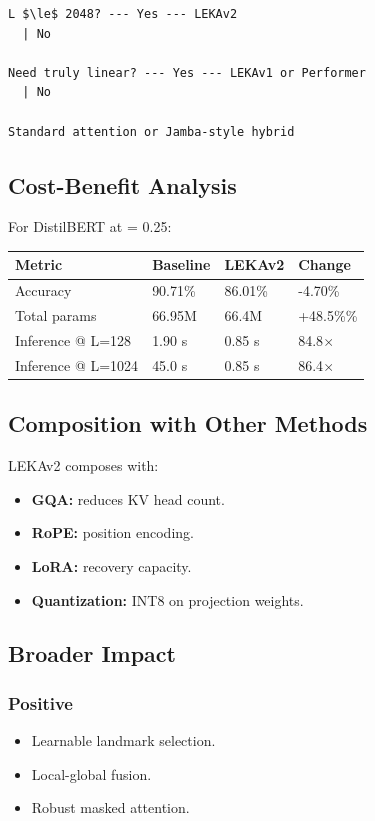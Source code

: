 \begin{lstlisting}
L $\le$ 2048? --- Yes --- LEKAv2
  | No
   
Need truly linear? --- Yes --- LEKAv1 or Performer
  | No
   
Standard attention or Jamba-style hybrid
\end{lstlisting}

\subsection{Cost-Benefit Analysis}

For DistilBERT at   = 0.25:

\begin{table}[H]
\centering
\small
\begin{tabular}{llll}
\toprule
\textbf{Metric} & \textbf{Baseline} & \textbf{LEKAv2} & \textbf{Change} \\
\midrule
Accuracy & 90.71\% & 86.01\% & -4.70\% \\
Total params & 66.95M & 66.4M & +48.5\%\% \\
Inference @ L=128 & 1.90 s & 0.85 s & 84.8$\times$ \\
Inference @ L=1024 & 45.0 s & 0.85 s & 86.4$\times$ \\
\bottomrule
\end{tabular}
\end{table}

\subsection{Composition with Other Methods}

LEKAv2 composes with:

\begin{itemize}
\item \textbf{GQA:} reduces KV head count.
\item \textbf{RoPE:} position encoding.
\item \textbf{LoRA:} recovery capacity.
\item \textbf{Quantization:} INT8 on projection weights.

\end{itemize}
\subsection{Broader Impact}

\subsubsection{Positive}
\begin{itemize}
\item Learnable landmark selection.
\item Local-global fusion.
\item Robust masked attention.

\end{itemize}
